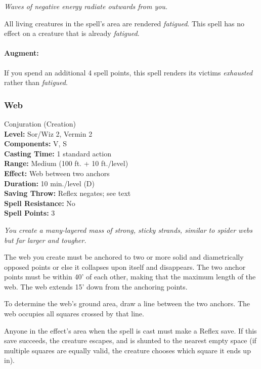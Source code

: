 \emph{Waves of negative energy radiate outwards from you.}

All living creatures in the spell's area are rendered \emph{fatigued}. This spell has no effect on a creature that is already \emph{fatigued}.

\paragraph{Augment:} If you spend an additional 4 spell points, this spell renders its victims \emph{exhausted} rather than \emph{fatigued}.
\subsubsection{Web}
\label{Spell:Web}
Conjuration (Creation)
\\ \textbf{Level:} Sor/Wiz 2, Vermin 2
\\ \textbf{Components:} V, S
\\ \textbf{Casting Time:} 1 standard action
\\ \textbf{Range:} Medium (100 ft. + 10 ft./level)
\\ \textbf{Effect:} Web between two anchors
\\ \textbf{Duration:} 10 min./level (D)
\\ \textbf{Saving Throw:} Reflex negates; see text
\\ \textbf{Spell Resistance:} No
\\ \textbf{Spell Points:} 3

\emph{You create a many-layered mass of strong, sticky strands, similar to spider webs but far larger and tougher.}

The web you create must be anchored to two or more solid and diametrically opposed points or else it collapses upon itself and disappears. 
The two anchor points must be within 40' of each other, making that the maximum length of the web. The web extends 15' down from the anchoring points. 

To determine the web's ground area, draw a line between the two anchors. The web occupies all squares crossed by that line.

Anyone in the effect's area when the spell is cast must make a Reflex save. 
If this save succeeds, the creature escapes, and is shunted to the nearest empty space 
(if multiple squares are equally valid, the creature chooses which square it ends up in). 

